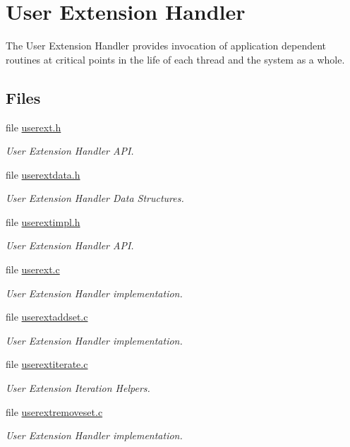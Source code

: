 \hypertarget{group__RTEMSScoreUserExt}{}\section{User Extension Handler}
\label{group__RTEMSScoreUserExt}


The User Extension Handler provides invocation of application dependent routines at critical points in the life of each thread and the system as a whole.  


\subsection*{Files}
\begin{DoxyCompactItemize}
\item 
file \mbox{\hyperlink{userext_8h}{userext.\+h}}
\begin{DoxyCompactList}\small\item\em User Extension Handler A\+PI. \end{DoxyCompactList}\item 
file \mbox{\hyperlink{userextdata_8h}{userextdata.\+h}}
\begin{DoxyCompactList}\small\item\em User Extension Handler Data Structures. \end{DoxyCompactList}\item 
file \mbox{\hyperlink{userextimpl_8h}{userextimpl.\+h}}
\begin{DoxyCompactList}\small\item\em User Extension Handler A\+PI. \end{DoxyCompactList}\item 
file \mbox{\hyperlink{userext_8c}{userext.\+c}}
\begin{DoxyCompactList}\small\item\em User Extension Handler implementation. \end{DoxyCompactList}\item 
file \mbox{\hyperlink{userextaddset_8c}{userextaddset.\+c}}
\begin{DoxyCompactList}\small\item\em User Extension Handler implementation. \end{DoxyCompactList}\item 
file \mbox{\hyperlink{userextiterate_8c}{userextiterate.\+c}}
\begin{DoxyCompactList}\small\item\em User Extension Iteration Helpers. \end{DoxyCompactList}\item 
file \mbox{\hyperlink{userextremoveset_8c}{userextremoveset.\+c}}
\begin{DoxyCompactList}\small\item\em User Extension Handler implementation. \end{DoxyCompactList}\end{DoxyCompactItemize}
